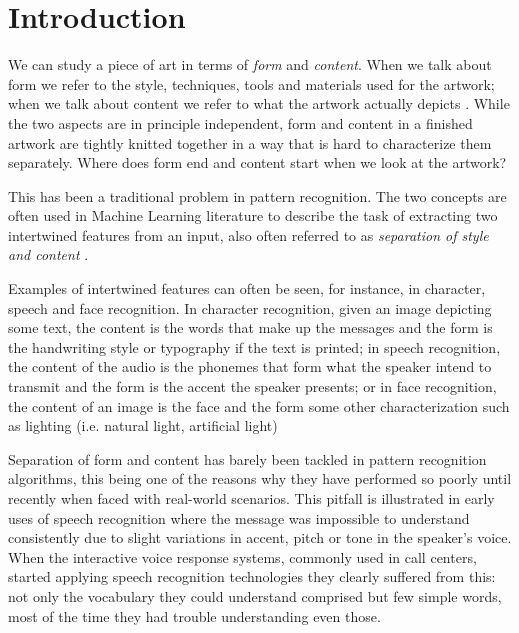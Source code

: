 
\chapter{Introduction}
\label{chap:intro}


We can study a piece of art in terms of \emph{form} and \emph{content}.
When we talk about form we refer to the style, techniques, tools and materials used for the artwork; when we talk about content we refer to what the artwork actually depicts \cite{Esaak}.
While the two aspects are in principle independent, form and content in a finished artwork are tightly knitted together in a way that is hard to characterize them separately. Where does form end and content start when we look at the artwork?

This has been a traditional problem in pattern recognition.
The two concepts are often used in Machine Learning literature to describe the task of extracting two intertwined features from an input, also often referred to as \emph{separation of style and content} \cite{Tenenbaum1997,Tenenbaum2000}.

Examples of intertwined features can often be seen, for instance, in character, speech and face recognition.
In character recognition, given an image depicting some text, the content is the words that make up the messages and the form is the handwriting style or typography if the text is printed; in speech recognition, the content of the audio is the phonemes that form what the speaker intend to transmit and the form is the accent the speaker presents; or in face recognition, the content of an image is the face and the form some other characterization such as lighting (i.e. natural light, artificial light)

Separation of form and content has barely been tackled in pattern recognition algorithms, this being one of the reasons why they have performed so poorly until recently when faced with real-world scenarios.
This pitfall is illustrated in early uses of speech recognition where the message was impossible to understand consistently due to slight variations in accent, pitch or tone in the speaker's voice.
When the interactive voice response systems, commonly used in call centers, started applying speech recognition technologies they clearly suffered from this: not only the vocabulary they could understand comprised but few simple words, most of the time they had trouble understanding even those.

